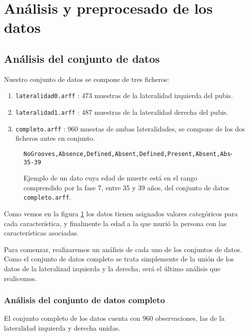 \section{Análisis y preprocesado de los datos}

\subsection{Análisis del conjunto de datos}

Nuestro conjunto de datos se compone de tres ficheros:

\begin{enumerate}
	\item \texttt{lateralidad0.arff} : 473 muestras de la lateralidad izquierda del pubis.
	\item \texttt{lateralidad1.arff} : 487 muestras de la lateralidad derecha del pubis.
	\item \texttt{completo.arff} : 960 muestas de ambas lateralidades, se compone de los dos ficheros antes en conjunto.
\end{enumerate}

\begin{figure}[H]
	\begin{lstlisting}[language={}]
	NoGrooves,Absence,Defined,Absent,Defined,Present,Absent,Absent,FormedWithoutRarefactions,Ph07-35-39
	\end{lstlisting}
	\caption{Ejemplo de un dato cuya edad de muerte está en el rango comprendido por la fase 7, entre 35 y 39 años, del conjunto de datos \texttt{completo.arff}.}
	\label{fig:ejemplo_dato}
\end{figure}

Como vemos en la figura \ref{fig:ejemplo_dato} los datos tienen asignados valores categóricos para cada característica, y finalmente la edad a la que murió la persona con las características asociadas.

Para comenzar, realizaremos un análisis de cada uno de los conjuntos de datos. Como el conjunto de datos completo se trata simplemente de la unión de los datos de la lateralizad izquierda y la derecha, será el último análisis que realicemos.

\subsubsection{Análisis del conjunto de datos completo}

El conjunto completo de los datos cuenta con 960 observaciones, las de la lateralidad izquierda y derecha unidas.

